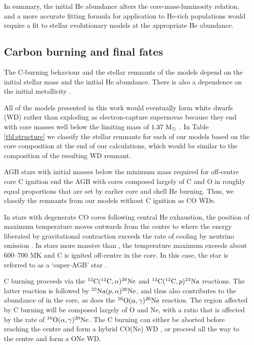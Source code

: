 In summary, the initial He abundance alters the core-mass-luminosity relation, and a more accurate fitting formula for application to He-rich populations would require a fit to stellar evolutionary models at the appropriate He abundance.

\subsection{Carbon burning and final fates}\label{sec:remnants}
The C-burning behaviour and the stellar remnants of the models depend on the initial stellar mass and the initial He abundance. There is also a dependence on the initial metallicity \citep{Cassisi:1993is,Umeda:1999ed}.

All of the models presented in this work would eventually form white dwarfs (WD) rather than exploding as electron-capture supernovae because they end with core masses well below the limiting mass of $1.37\ \mathrm{M}_{\odot}$ \citep{Miyaji:1980uz}. In Table \ref{tbl:structure} we classify the stellar remnants for each of our models based on the core composition at the end of our calculations, which would be similar to the composition of the resulting WD remnant.

AGB stars with initial masses below the minimum mass required for off-centre core C ignition \citep[, as defined by][]{Becker:1979jk} end the AGB with cores composed largely of C and O in roughly equal proportions that are set by earlier core and shell He burning. Thus, we classify the remnants from our models without C ignition as CO WDs.

In stars with degenerate CO cores following central He exhaustion, the position of maximum temperature moves outwards from the centre to where the energy liberated by gravitational contraction exceeds the rate of cooling by neutrino emission \citep{Becker:1979jk}. In stars more massive than , the temperature maximum exceeds about 600--700 MK \citep{Siess:2006ki} and C is ignited off-centre in the core. In this case, the star is referred to as a `super-AGB' star \citep{GarciaBerro:1994kp,Siess:2007ih,Siess:2010hj}.

C burning proceeds via the $\mbox{${}^{12}{\text{C}}$}(\mbox{${}^{12}{\text{C}}$}, \alpha)\mbox{${}^{20}{\text{Ne}}$}$ and $\mbox{${}^{12}{\text{C}}$}(\mbox{${}^{12}{\text{C}}$}, p)\mbox{${}^{23}{\text{Na}}$}$ reactions. The latter reaction is followed by $\mbox{${}^{23}{\text{Na}}$}(p,\alpha)\mbox{${}^{20}{\text{Ne}}$}$, and thus also contributes to the abundance of  in the core, as does the $\mbox{${}^{16}{\text{O}}$}(\alpha,\gamma)\mbox{${}^{20}{\text{Ne}}$}$ reaction. The region affected by C burning will be composed largely of O and Ne, with a ratio that is affected by the rate of $\mbox{${}^{16}{\text{O}}$}(\alpha,\gamma)\mbox{${}^{20}{\text{Ne}}$}$. The C burning can either be aborted before reaching the centre and form a hybrid CO(Ne) WD \citep{Doherty:2010fk,Karakas:2012kc,Denissenkov:2013dd}, or proceed all the way to the centre and form a ONe WD.

